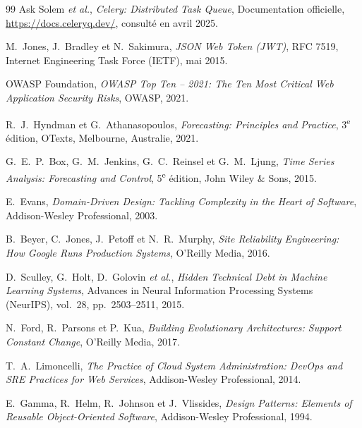 \begin{thebibliography}{99}
Ask Solem \textit{et al.},
\textit{Celery: Distributed Task Queue},
Documentation officielle, \url{https://docs.celeryq.dev/}, consulté en avril 2025.


M.~Jones, J.~Bradley et N.~Sakimura,
\textit{JSON Web Token (JWT)},
RFC 7519, Internet Engineering Task Force (IETF), mai 2015.

OWASP Foundation,
\textit{OWASP Top Ten -- 2021: The Ten Most Critical Web Application Security Risks},
OWASP, 2021.


R.~J.~Hyndman et G.~Athanasopoulos,
\textit{Forecasting: Principles and Practice},
3\textsuperscript{e} édition, OTexts, Melbourne, Australie, 2021.

G.~E.~P.~Box, G.~M.~Jenkins, G.~C.~Reinsel et G.~M.~Ljung,
\textit{Time Series Analysis: Forecasting and Control},
5\textsuperscript{e} édition, John Wiley \& Sons, 2015.

E.~Evans,
\textit{Domain-Driven Design: Tackling Complexity in the Heart of Software},
Addison-Wesley Professional, 2003.

B.~Beyer, C.~Jones, J.~Petoff et N.~R.~Murphy,
\textit{Site Reliability Engineering: How Google Runs Production Systems},
O'Reilly Media, 2016.

D.~Sculley, G.~Holt, D.~Golovin \textit{et al.},
\textit{Hidden Technical Debt in Machine Learning Systems},
Advances in Neural Information Processing Systems (NeurIPS), vol.~28, pp.~2503--2511, 2015.

N.~Ford, R.~Parsons et P.~Kua,
\textit{Building Evolutionary Architectures: Support Constant Change},
O'Reilly Media, 2017.

T.~A.~Limoncelli,
\textit{The Practice of Cloud System Administration: DevOps and SRE Practices for Web Services},
Addison-Wesley Professional, 2014.

E.~Gamma, R.~Helm, R.~Johnson et J.~Vlissides,
\textit{Design Patterns: Elements of Reusable Object-Oriented Software},
Addison-Wesley Professional, 1994.



\end{thebibliography}
